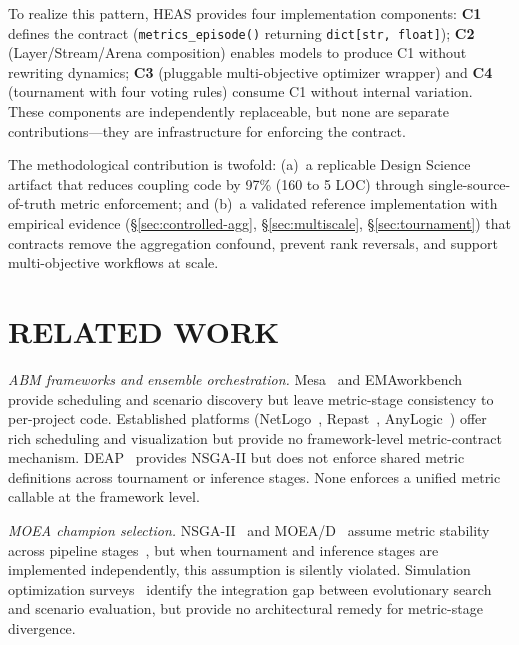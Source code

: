 \documentclass{wscpaperproc}
\begin{document}
To realize this pattern, HEAS provides four implementation components:
\textbf{C1} defines the contract (\texttt{metrics\_episode()} returning
\texttt{dict[str, float]}); \textbf{C2} (Layer/Stream/Arena composition) enables
models to produce C1 without rewriting dynamics; \textbf{C3} (pluggable multi-objective
optimizer wrapper) and \textbf{C4} (tournament with four voting rules) consume C1
without internal variation. These components are independently replaceable, but none
are separate contributions---they are infrastructure for enforcing the contract.

The methodological contribution is twofold: (a)~a replicable Design Science
artifact that reduces coupling code by 97\% (160 to 5 LOC) through
single-source-of-truth metric enforcement; and (b)~a validated reference
implementation with empirical evidence (\S\ref{sec:controlled-agg},
\S\ref{sec:multiscale}, \S\ref{sec:tournament}) that contracts remove the
aggregation confound, prevent rank reversals, and support multi-objective
workflows at scale.

\section{RELATED WORK}

\textit{ABM frameworks and ensemble orchestration.}
Mesa~\cite{kazil2020mesa} and EMAworkbench~\cite{kwakkel2017workbench} provide
scheduling and scenario discovery but leave metric-stage consistency to
per-project code. Established platforms (NetLogo~\cite{wilensky1999netlogo},
Repast~\cite{collier2022repast4py}, AnyLogic~\cite{borshchev2013anylogic})
offer rich scheduling and visualization but provide no framework-level
metric-contract mechanism. DEAP~\cite{fortin2012deap} provides NSGA-II but does not
enforce shared metric definitions across tournament or inference stages. None
enforces a unified metric callable at the framework level.

\textit{MOEA champion selection.}
NSGA-II~\cite{deb2002nsga2} and MOEA/D~\cite{zhang2007moead} assume metric
stability across pipeline stages~\cite{fu2002optimization}, but when tournament
and inference stages are implemented independently, this assumption is silently
violated. Simulation optimization surveys~\cite{andradottir2015overview,tekin2004simulation}
identify the integration gap between evolutionary search and scenario evaluation,
but provide no architectural remedy for metric-stage divergence.
\end{document}
